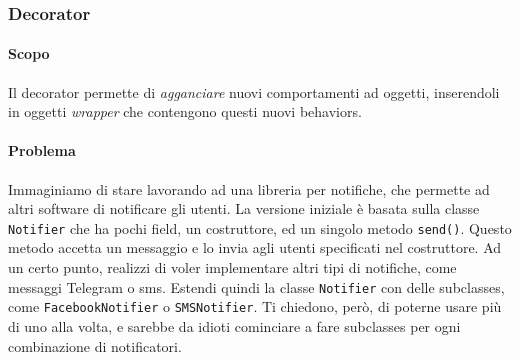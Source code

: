 \documentclass[11pt]{article}
\newcommand{\code}[1]{\texttt{#1}}
\begin{document}
\subsubsection{Decorator}
\paragraph{Scopo}
Il decorator permette di \textit{agganciare} nuovi comportamenti ad oggetti, inserendoli in oggetti \textit{wrapper} che contengono questi nuovi behaviors.
\paragraph{Problema}
Immaginiamo di stare lavorando ad una libreria per notifiche, che permette ad altri software di notificare gli utenti. La versione iniziale è basata sulla classe \code{Notifier} che ha pochi field, un costruttore, ed un singolo metodo \code{send()}. Questo metodo accetta un messaggio e lo invia agli utenti specificati nel costruttore. Ad un certo punto, realizzi di voler implementare altri tipi di notifiche, come messaggi Telegram o sms. Estendi quindi la classe \code{Notifier} con delle subclasses, come \code{FacebookNotifier} o \code{SMSNotifier}. Ti chiedono, però, di poterne usare più di uno alla volta, e sarebbe da idioti cominciare a fare subclasses per ogni combinazione di notificatori.
\end{document}
